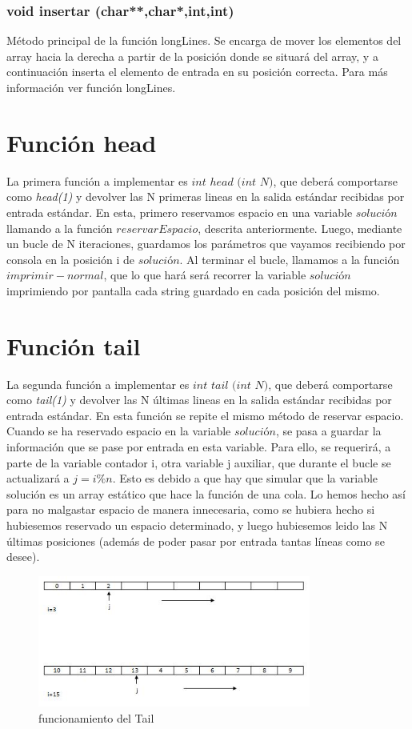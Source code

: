 \subsubsection{void insertar (char**,char*,int,int)}
Método principal de la función longLines. Se encarga de mover los elementos del array hacia la derecha a partir de la posición donde se situará  del array, y a continuación inserta el elemento de entrada en su posición correcta. Para más información ver función longLines. 
\section{Función head}
La primera función a implementar es $int$ $head$ $(int$ $N)$, que deberá comportarse como \textit{head(1)} y devolver las N primeras lineas en la salida estándar recibidas por entrada estándar.
En esta, primero reservamos espacio en una variable $solución$ llamando a la función $reservarEspacio$, descrita anteriormente. Luego, mediante un bucle de N iteraciones, guardamos los parámetros que vayamos recibiendo por consola en la posición i de $solución$.
Al terminar el bucle, llamamos a la función $imprimir-normal$, que lo que hará será recorrer la variable $solución$ imprimiendo por pantalla cada string guardado en cada posición del mismo.
\section{Función tail}
La segunda función a implementar es $int$ $tail$ $(int$ $N)$, que deberá comportarse como \textit{tail(1)} y devolver las N últimas lineas en la salida estándar recibidas por entrada estándar.
En esta función se repite el mismo método de reservar espacio. Cuando se ha reservado espacio en la variable $solución$, se pasa a guardar la información que se pase por entrada en esta variable. Para ello, se requerirá, a parte de la variable contador i, otra variable j auxiliar, que durante el bucle se actualizará a $j=i\%n$. Esto es debido a que hay que simular que la variable solución es un array estático que hace la función de una cola. Lo hemos hecho así para no malgastar espacio de manera innecesaria, como se hubiera hecho si hubiesemos reservado un espacio determinado, y luego hubiesemos leido las N últimas posiciones (además de poder pasar por entrada tantas líneas como se desee).
\begin{figure}[htb]
\begin{center}
\centering
  \includegraphics[width=0.8\textwidth]{./img_1}
  \caption{funcionamiento del Tail}
  \label{fig:Funcionamiento del Tail}
\end{center}
\end{figure} 

